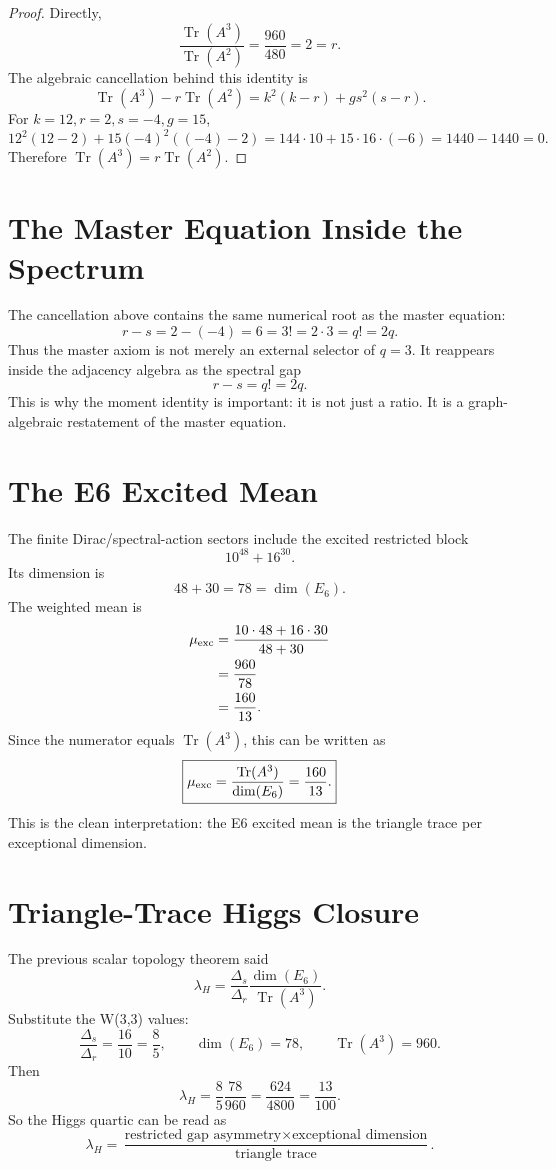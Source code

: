 \documentclass[11pt]{article}
\theoremstyle{definition}
\newcommand{\Tr}{\operatorname{Tr}}
\newcommand{\lamH}{\lambda_H}
\newcommand{\Deltar}{\Delta_r}
\newcommand{\Deltas}{\Delta_s}
\begin{document}
\begin{proof}
Directly,
\[
  \frac{\Tr(A^3)}{\Tr(A^2)}=\frac{960}{480}=2=r.
\]
The algebraic cancellation behind this identity is
\[
  \Tr(A^3)-r\Tr(A^2)
  = k^2(k-r)+gs^2(s-r).
\]
For \(k=12,r=2,s=-4,g=15\),
\[
  12^2(12-2)+15(-4)^2((-4)-2)
  =144\cdot 10+15\cdot16\cdot(-6)
  =1440-1440=0.
\]
Therefore \(\Tr(A^3)=r\Tr(A^2)\).
\end{proof}

\section{The Master Equation Inside the Spectrum}

The cancellation above contains the same numerical root as the master equation:
\[
  r-s=2-(-4)=6=3!=2\cdot 3=q!=2q.
\]
Thus the master axiom is not merely an external selector of \(q=3\).  It reappears inside the adjacency algebra as the spectral gap
\[
  \boxed{r-s=q!=2q.}
\]
This is why the moment identity is important: it is not just a ratio. It is a graph-algebraic restatement of the master equation.

\section{The E6 Excited Mean}

The finite Dirac/spectral-action sectors include the excited restricted block
\[
  10^{48}+16^{30}.
\]
Its dimension is
\[
  48+30=78=\dim(E_6).
\]
The weighted mean is
\[
\begin{aligned}
  \mu_{\rm exc}
  &= \frac{10\cdot48+16\cdot30}{48+30} \\
  &= \frac{960}{78} \\
  &= \frac{160}{13}.
\end{aligned}
\]
Since the numerator equals \(\Tr(A^3)\), this can be written as
\[
  \boxed{\displaystyle
  \mu_{\rm exc}=\frac{\Tr(A^3)}{\dim(E_6)}=\frac{160}{13}.}
\]
This is the clean interpretation: the E6 excited mean is the triangle trace per exceptional dimension.

\section{Triangle-Trace Higgs Closure}

The previous scalar topology theorem said
\[
  \lamH = \frac{\Deltas}{\Deltar}\frac{\dim(E_6)}{\Tr(A^3)}.
\]
Substitute the W(3,3) values:
\[
  \frac{\Deltas}{\Deltar}=\frac{16}{10}=\frac85,
  \qquad \dim(E_6)=78,
  \qquad \Tr(A^3)=960.
\]
Then
\[
  \lamH=\frac85\frac{78}{960}=\frac{624}{4800}=\frac{13}{100}.
\]
So the Higgs quartic can be read as
\[
  \boxed{\displaystyle
  \lamH = \frac{\text{restricted gap asymmetry}\times\text{exceptional dimension}}
  {\text{triangle trace}}.}
\]
\end{document}
